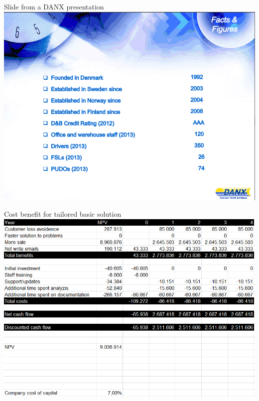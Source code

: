 \begin{thebibliography}{9}
	Slide from a DANX presentation\\
	\includegraphics[scale=0.62]{img/DANX_FSL_PUDO}

	Cost benefit for tailored basic solution\\
	\includegraphics[scale=0.6]{img/CostBenefit_TailoredBasic}


\end{thebibliography}

